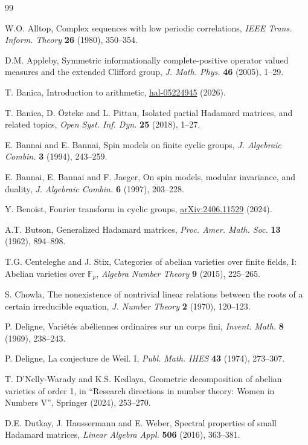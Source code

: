 \documentclass[11pt]{amsart}
\theoremstyle{definition}
\begin{document}
\begin{thebibliography}{99}

W.O. Alltop, Complex sequences with low periodic correlations, {\em IEEE Trans. Inform. Theory} {\bf 26} (1980), 350--354.

D.M. Appleby, Symmetric informationally complete-positive operator valued measures and the extended Clifford group, {\em J. Math. Phys.} {\bf 46} (2005), 1--29.

T. Banica, Introduction to arithmetic, \mbox{\href{https://hal.science/hal-05224945}{hal-05224945}} (2026).

T. Banica, D. \"Ozteke and L. Pittau, Isolated partial Hadamard matrices, and related topics, {\em Open Syst. Inf. Dyn.} {\bf 25} (2018), 1--27.

E. Bannai and E. Bannai, Spin models on finite cyclic groups, {\em J. Algebraic Combin.} {\bf 3} (1994), 243--259.

E. Bannai, E. Bannai and F. Jaeger, On spin models, modular invariance, and duality, {\em J. Algebraic Combin.} {\bf 6} (1997), 203--228.

Y. Benoist, Fourier transform in cyclic groups, \mbox{\href{https://arxiv.org/pdf/2406.11529}{arXiv:2406.11529}} (2024).

A.T. Butson, Generalized Hadamard matrices, {\em Proc. Amer. Math. Soc.} {\bf 13} (1962), 894--898.

T.G. Centeleghe and J. Stix, Categories of abelian varieties over finite fields, I: Abelian varieties over $\mathbb F_p$, {\em Algebra Number Theory} {\bf 9} (2015), 225--265.

S. Chowla, The nonexistence of nontrivial linear relations between the roots of a certain irreducible equation, {\em J. Number Theory} {\bf 2} (1970), 120--123.

P. Deligne, Vari\'et\'es ab\'eliennes ordinaires sur un corps fini, {\em Invent. Math.} {\bf 8} (1969), 238--243.

P. Deligne, La conjecture de Weil. I, {\em Publ. Math. IHES} {\bf 43} (1974), 273--307.

T. D'Nelly-Warady and K.S. Kedlaya, Geometric decomposition of abelian varieties of order 1, in ``Research directions in number theory: Women in Numbers V'', Springer (2024), 253--270.

D.E. Dutkay, J. Haussermann and E. Weber, Spectral properties of small Hadamard matrices, {\em Linear Algebra Appl.} {\bf 506} (2016), 363--381.


\end{thebibliography}
\end{document}
